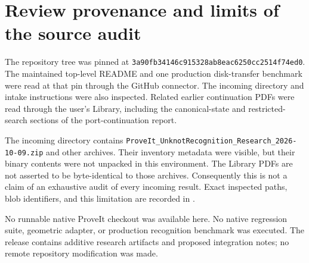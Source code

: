 \documentclass[11pt,a4paper]{article}
\theoremstyle{remark}\newtheorem{remark}[theorem]{Remark}
\newcommand{\snapshot}{3a90fb34146c915328ab8eac6250cc2514f74ed0}
\begin{document}
\section{Review provenance and limits of the source audit}
The repository tree was pinned at \texttt{\snapshot}. The maintained top-level README and one production disk-transfer benchmark were read at that pin through the GitHub connector. The incoming directory and intake instructions were also inspected. Related earlier continuation PDFs were read through the user's Library, including the canonical-state and restricted-search sections of the port-continuation report.

The incoming directory contains \texttt{ProveIt\_UnknotRecognition\_Research\_2026-10-09.zip} and other archives. Their inventory metadata were visible, but their binary contents were not unpacked in this environment. The Library PDFs are not asserted to be byte-identical to those archives. Consequently this is not a claim of an exhaustive audit of every incoming result. Exact inspected paths, blob identifiers, and this limitation are recorded in .

No runnable native ProveIt checkout was available here. No native regression suite, geometric adapter, or production recognition benchmark was executed. The release contains additive research artifacts and proposed integration notes; no remote repository modification was made.
\end{document}
